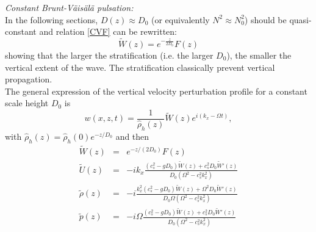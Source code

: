 \documentclass[a4paper,11pt]{article}
\begin{document}
\textit{Constant Brunt-Väisälä pulsation:}\\
In the following sections, $D(z)\approx D_0$ (or equivalently $N^2\approx N_0^2$) should be quasi-constant and relation \ref{CVF} can be rewritten:
\begin{equation}
  \displaystyle
  \widetilde{W}(z)=e^{-\frac{z}{2D_0}}F(z)
  \label{CVF2}
\end{equation}
showing that the larger the stratification (i.e. the larger $D_0$), the smaller the vertical extent of the wave. The stratification classically prevent vertical propagation.\\
The general expression of the vertical velocity perturbation profile for a constant scale height $D_0$ is
\begin{equation}
  \displaystyle
  w(x,z,t)=\frac{1}{\hat{\rho}_h(z)}\widetilde{W}(z)e^{i(k_x-\Omega t)},
\end{equation}
with $\hat{\rho}_h(z)=\hat{\rho}_h(0)e^{-z/D_0}$ and then
\begin{equation}
  \displaystyle
  \begin{array}{rcl}
  	\widetilde{W}(z)&=&e^{-z/(2D_0)}F(z)\\[4mm]
    \widetilde{U}(z)&=&\displaystyle  -ik_x\frac{(c_s^2-gD_0)\widetilde{W}(z)+c_s^2D_0\widetilde{W}'(z)}{D_0(\Omega^2-c_s^2k_x^2)}\\[4mm]
    \widetilde{\rho}(z)&=&\displaystyle -i\frac{k_x^2(c_s^2-gD_0)\widetilde{W}(z)+\Omega^2D_0\widetilde{W}'(z)}{D_0\Omega(\Omega^2-c_s^2k_x^2)}\\[4mm]
    \widetilde{p}(z)&=&\displaystyle -i\Omega\frac{(c_s^2-gD_0)\widetilde{W}(z)+c_s^2D_0\widetilde{W}'(z)}{D_0(\Omega^2-c_s^2k_x^2)}
\end{array}
\end{equation}
\end{document}
